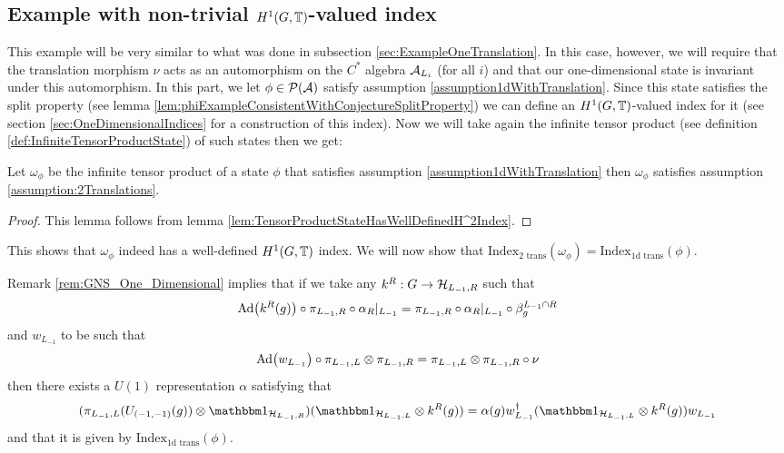 \documentclass[11pt,a4paper,twoside]{article}
\numberwithin{equation}{section}
\begin{document}
	\subsection{Example with non-trivial \texorpdfstring{$H^1(G,\TT)$}{}-valued index}\label{sec:ExampleTwoTranslations}
	This example will be very similar to what was done in subsection \ref{sec:ExampleOneTranslation}. In this case, however, we will require that the translation morphism $\nu$ acts as an automorphism on the $C^*$ algebra $\AA_{L_i}$ (for all $i$) and that our one-dimensional state is invariant under this automorphism. In this part, we let $\phi\in\PP(\AA)$ satisfy assumption \ref{assumption1dWithTranslation}. Since this state satisfies the split property (see lemma \ref{lem:phiExampleConsistentWithConjectureSplitProperty}) we can define an $H^1(G,\TT)$-valued index for it (see section \ref{sec:OneDimensionalIndices} for a construction of this index). Now we will take again the infinite tensor product (see definition \ref{def:InfiniteTensorProductState}) of such states then we get:
	\begin{lemma}
		Let $\omega_\phi$ be the infinite tensor product of a state $\phi$ that satisfies assumption \ref{assumption1dWithTranslation} then $\omega_\phi$ satisfies assumption \ref{assumption:2Translations}.
	\end{lemma}
	\begin{proof}
		This lemma follows from lemma \ref{lem:TensorProductStateHasWellDefinedH^2Index}.
	\end{proof}
	This shows that $\omega_\phi$ indeed has a well-defined $H^1(G,\TT)$ index. We will now show that $\textrm{Index}_{\text{2 trans}}(\omega_\phi)=\textrm{Index}_{\text{1d trans}}(\phi)$.
	\begin{remark}\label{rem:GNS_One_DimensionalTwoTranslations}
		Remark \ref{rem:GNS_One_Dimensional} implies that if we take any $k^R:G\rightarrow \HH_{L_{-1},R}$ such that
		\begin{equation}
			\Ad{k^R(g)}\circ\pi_{L_{-1},R}\circ\alpha_R|_{L_{-1}}=\pi_{L_{-1},R}\circ\alpha_R|_{L_{-1}}\circ\beta_{g}^{L_{-1}\cap R}
		\end{equation}
		and $w_{L_{-1}}$ to be such that
		\begin{equation}
			\Ad{w_{L_{-1}}}\circ\pi_{L_{-1},L}\otimes \pi_{L_{-1},R}=\pi_{L_{-1},L}\otimes \pi_{L_{-1},R}\circ\nu
		\end{equation}
		then there exists a $U(1)$ representation $\alpha$ satisfying that
		\begin{equation}
			(\pi_{L_{-1},L}(U_{(-1,-1)}(g))\otimes \id_{\HH_{L_{-1},R}}) (\id_{\HH_{L_{-1},L}}\otimes k^R(g))=\alpha(g) w_{L_{-1}}^\dagger(\id_{\HH_{L_{-1},L}}\otimes k^R(g))w_{L_{-1}}
		\end{equation}
		and that it is given by $\textrm{Index}_{\text{1d trans}}(\phi)$.
	\end{remark}
\end{document}
